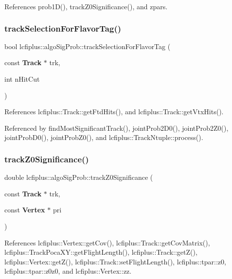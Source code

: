 References prob1\+D(), track\+Z0\+Significance(), and zpars.

\mbox{\label{namespacelcfiplus_1_1algoSigProb_aa237d31224316cd7bdd7ff494b898b6e}} 
\subsubsection{track\+Selection\+For\+Flavor\+Tag()}
{\footnotesize\ttfamily bool lcfiplus\+::algo\+Sig\+Prob\+::track\+Selection\+For\+Flavor\+Tag (\begin{DoxyParamCaption}\item[{const \textbf{ Track} $\ast$}]{trk,  }\item[{int}]{n\+Hit\+Cut }\end{DoxyParamCaption})}



References lcfiplus\+::\+Track\+::get\+Ftd\+Hits(), and lcfiplus\+::\+Track\+::get\+Vtx\+Hits().



Referenced by find\+Most\+Significant\+Track(), joint\+Prob2\+D0(), joint\+Prob2\+Z0(), joint\+Prob\+D0(), joint\+Prob\+Z0(), and lcfiplus\+::\+Track\+Ntuple\+::process().

\mbox{\label{namespacelcfiplus_1_1algoSigProb_a7edf49cc18ec154a434d430ce16172ca}} 
\subsubsection{track\+Z0\+Significance()}
{\footnotesize\ttfamily double lcfiplus\+::algo\+Sig\+Prob\+::track\+Z0\+Significance (\begin{DoxyParamCaption}\item[{const \textbf{ Track} $\ast$}]{trk,  }\item[{const \textbf{ Vertex} $\ast$}]{pri }\end{DoxyParamCaption})}



References lcfiplus\+::\+Vertex\+::get\+Cov(), lcfiplus\+::\+Track\+::get\+Cov\+Matrix(), lcfiplus\+::\+Track\+Poca\+X\+Y\+::get\+Flight\+Length(), lcfiplus\+::\+Track\+::get\+Z(), lcfiplus\+::\+Vertex\+::get\+Z(), lcfiplus\+::\+Track\+::set\+Flight\+Length(), lcfiplus\+::tpar\+::z0, lcfiplus\+::tpar\+::z0z0, and lcfiplus\+::\+Vertex\+::zz.



